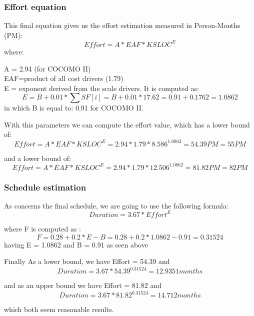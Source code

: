\documentclass{article}
\begin{document}
\begin{flushleft}
\subsubsection{Effort equation}%
This final equation gives us the effort estimation measured in Person-Months (PM):
 \[Effort = A * EAF * KSLOC^E    \]
 where:
 
 A = 2.94 (for COCOMO II)\\
EAF=product of all cost drivers (1.79)\\
E = exponent derived from the scale drivers. It is computed as:\\
\[E = B+ 0.01 * \sum {SF[i]} = B+ 0.01 * 17.62 = 0.91 + 0.1762 = 1.0862\]
 in which B is equal to: 0.91 for COCOMO II. 
 
 
 With this parameters we can compute the effort value, which has a lower bound of:
  \[Effort = A * EAF * KSLOC^E   = 2.94 * 1.79 * 8.586 ^ {1.0862}  = 54.39PM = 55PM\]
 
 and a lower bound of:
  \[Effort = A * EAF * KSLOC^E  = 2.94 * 1.79 * 12.506 ^ {1.0862}  = 81.82PM = 82PM \]
\newpage
\subsubsection{Schedule estimation}%
As concerns the final schedule, we are going to use the following formula:
\[Duration = 3.67 * Effort^E\]

where F is computed as :
\[F = 0.28 + 0.2 * {E - B} = 0.28 + 0.2 * {1.0862 - 0.91} = 0.31524\]
having E = 1.0862 and B = 0.91 as seen above


Finally As a lower bound, we have Effort = 54.39 and
\[ Duration = 3.67 * 54.39^{0.31524} = 12.9351 months\]

and as an upper bound  we have Effort = 81.82 and
\[ Duration = 3.67 * 81.82^{0.31524} =14.712 months  \]

which both seem reasonable results.





\end{flushleft}
\end{document}
